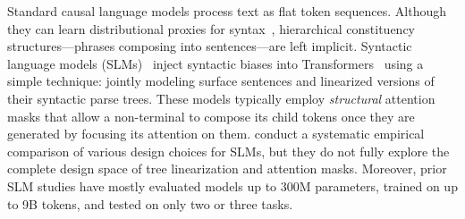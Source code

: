 \documentclass[11pt]{article}
\begin{document}
Standard causal language models process text as flat token sequences. Although they can learn distributional proxies for syntax~\cite{hu-etal-2020-systematic}, hierarchical constituency structures---phrases composing into sentences---are left implicit. %
Syntactic language models (SLMs)~\cite{sartran-etal-2022-transformer, hu-etal-2024-generative, murty-etal-2023-pushdown, zhao-etal-2024-dependency, huang2026GiLT} inject syntactic biases into Transformers~\cite{vaswani2017attention} using a simple technique: jointly modeling surface sentences and linearized versions of their syntactic parse trees. 
These models typically employ \emph{structural} attention masks that allow a non-terminal to compose its child tokens once they are generated by focusing its attention on them.
\citet{zhao-etal-2025-systematic} conduct a systematic empirical comparison of various design choices for SLMs, but they do not fully explore the complete design space of tree linearization and attention masks.
Moreover, prior SLM studies have mostly evaluated models up to 300M parameters, trained on up to 9B tokens, and tested on only two or three tasks.
\end{document}
